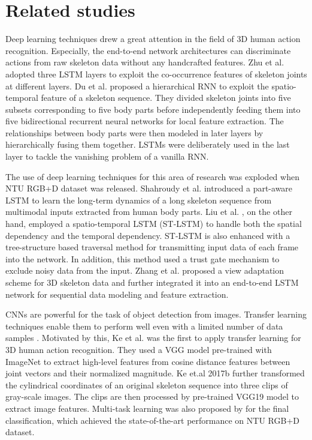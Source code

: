 \documentclass{bmvc2k}
\begin{document}
\section{Related studies}
	\label{sec:rl_studies}
Deep learning techniques drew a great attention in the field of 3D human action recognition. Especially, the end-to-end network architectures can discriminate actions from raw skeleton data without any handcrafted features. Zhu et al.  \cite{zhu2016co} adopted three LSTM layers to exploit the co-occurrence features of skeleton joints at different layers. Du et al. \cite{du2015hierarchical} proposed a hierarchical RNN to exploit the spatio-temporal feature of a skeleton sequence. They divided skeleton joints into five subsets corresponding to five body parts before independently feeding them into five bidirectional recurrent neural networks for local feature extraction. The relationships between body parts were then modeled in later layers by hierarchically fusing them together. LSTMs were deliberately used in the last layer to tackle the vanishing problem of a vanilla RNN.

The use of deep learning techniques for this area of research was exploded when NTU RGB+D dataset \cite{shahroudy2016ntu} was released. Shahroudy et al. \cite{shahroudy2016ntu} introduced a part-aware LSTM to learn the long-term dynamics of a long skeleton sequence from multimodal inputs extracted from human body parts. Liu et al. \cite{liu2016spatio}, on the other hand, employed a spatio-temporal LSTM (ST-LSTM) to handle both the spatial dependency and the temporal dependency. ST-LSTM is also enhanced with a tree-structure based traversal method for transmitting input data of each frame into the network. 
In addition, this method used a trust gate mechanism to exclude noisy data from the input. Zhang et al. \cite{zhang2017view} proposed a view adaptation scheme for 3D skeleton data and further integrated it into an end-to-end LSTM network for sequential data modeling and feature extraction. 

CNNs are powerful for the task of object detection from images. Transfer learning techniques enable them to perform well even with a limited number of data samples \cite{wagner2013learning, long2015learning}. Motivated by this, Ke et al. \cite{ke2017skeletonnet} was the first to apply transfer learning for 3D human action recognition. They used a VGG model \cite{Chatfield14} pre-trained with ImageNet to extract high-level features from cosine distance features between joint vectors and their normalized magnitude. Ke et.al 2017b \cite{ke2017new} further transformed the cylindrical coordinates of an original skeleton sequence into three clips of gray-scale images. The clips are then processed by pre-trained VGG19 model \cite{simonyan2014very} to extract image features. Multi-task learning was also proposed by \cite{ke2017new} for the final classification, which achieved the state-of-the-art performance on NTU RGB+D dataset.
\end{document}
